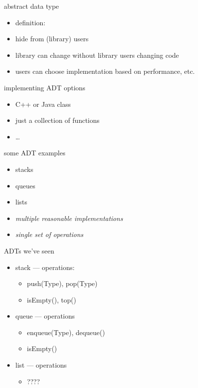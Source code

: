 \begin{frame}{abstract data type}
\begin{itemize}
\item definition: 
\vspace{.5cm}
\item<2-> hide  from (library) users
\item<2-> library can change without library users changing code
\item<2-> users can choose implementation based on performance, etc.
\end{itemize}
\end{frame}


\begin{frame}{implementing ADT options}
    \begin{itemize}
    \item C++ or Java class
    \item just a collection of functions
    \item \ldots
    \end{itemize}
\end{frame}

\begin{frame}{some ADT examples}
    \begin{itemize}
        \item stacks
        \item queues
        \item lists
            \vspace{.5cm}
        \item \textit{multiple reasonable implementations}
        \item \textit{single set of operations}
    \end{itemize}
\end{frame}


\begin{frame}[fragile,label=stackAdtOps]{ADTs we've seen}
    \begin{itemize}
    \item stack --- operations:
        \begin{itemize}
        \item push(Type), pop(Type)
        \item isEmpty(), top()
        \end{itemize}
    \item queue --- operations
        \begin{itemize}
        \item enqueue(Type), dequeue()
        \item isEmpty()
        \end{itemize}
    \item list  --- operations
        \begin{itemize}
        \item ????
        \end{itemize}
    \end{itemize}
\end{frame}


